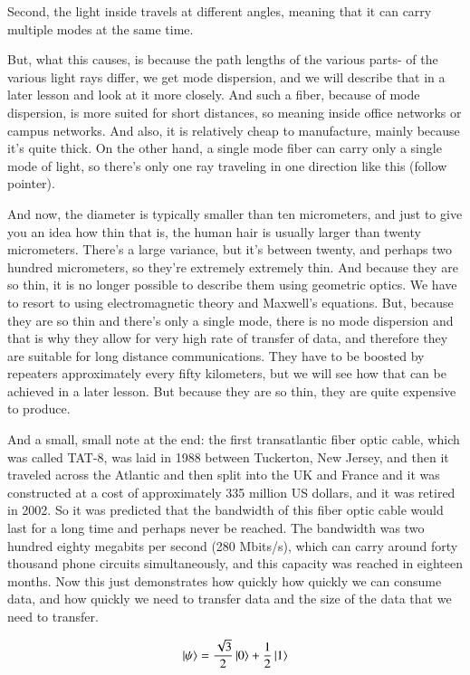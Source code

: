 Second, the light inside travels at different angles, meaning that it can carry multiple modes at the same time.

But, what this causes, is because the path lengths of the various parts- of the various light rays differ, we get mode dispersion, and we will describe that in a later lesson and look at it more closely. And such a fiber, because of mode dispersion, is more suited for short distances, so meaning inside office networks or campus networks. And also, it is relatively cheap to manufacture, mainly because it's quite thick. On the other hand, a single mode fiber can carry only a single mode of light, so there's only one ray traveling in one direction like this (follow pointer).

And now, the diameter is typically smaller than ten micrometers, and just to give you an idea how thin that is, the human hair is usually larger than twenty micrometers. There's a large variance, but it's between twenty, and perhaps two hundred micrometers, so they're extremely extremely thin. And because they are so thin, it is no longer possible to describe them using geometric optics. We have to resort to using electromagnetic theory and Maxwell's equations. But, because they are so thin and there's only a single mode, there is no mode dispersion and that is why they allow for very high rate of transfer of data, and therefore they are suitable for long distance communications. They have to be boosted by repeaters approximately every fifty kilometers, but we will see how that can be achieved in a later lesson. But because they are so thin, they are quite expensive to produce.

And a small, small note at the end: the first transatlantic fiber optic cable, which was called TAT-8, was laid in 1988 between Tuckerton, New Jersey, and then it traveled across the Atlantic and then split into the UK and France and it was constructed at a cost of approximately 335 million US dollars, and it was retired in 2002. So it was predicted that the bandwidth of this fiber optic cable would last for a long time and perhaps never be reached. The bandwidth was two hundred eighty megabits per second (280 Mbits/s), which can carry around forty thousand phone circuits simultaneously, and this capacity was reached in eighteen months. Now this just demonstrates how quickly how quickly we can consume data, and how quickly we need to transfer data and the size of the data that we need to transfer.



\newpage
\begin{exercises}
\begin{equation*}
\ket{\psi} = \frac{\sqrt{3}}{2}\ket{0} + \frac{1}{2}\ket{1}
\end{equation*}


\end{exercises}

